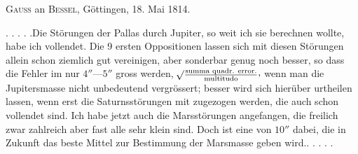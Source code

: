 \par{}\bigskip
\begin{center}
\textsc{Gauss} an \textsc{Bessel}, Göttingen, 18. Mai 1814.
\end{center}
\noindent\hspace*{\parindent}. . . . .\quad Die Störungen der Pallas durch Jupiter, so weit ich sie berechnen wollte, habe ich vollendet. Die 9 ersten Oppositionen lassen sich mit diesen Störungen allein schon ziemlich gut vereinigen, aber sonderbar genug noch  besser, so dass die Fehler im  nur \(4''\text{—}5''\) gross werden, \(\BareRoot{\frac{\text{summa quadr. error.}}{\text{multitudo}}}\mathpunct{\raisebox{.45ex}{,}}\) wenn man die Jupitersmasse nicht unbedeutend vergrössert; besser wird sich hierüber urtheilen lassen, wenn erst die Saturnsstörungen mit zugezogen werden, die auch schon vollendet sind. Ich habe jetzt auch die Marsstörungen angefangen, die freilich zwar zahlreich aber fast alle sehr klein sind. Doch ist eine von \(10''\) dabei, die in Zukunft das beste Mittel zur Bestimmung der Marsmasse geben wird.\quad . . . . .
\par

